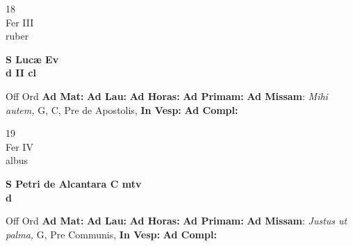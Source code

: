 \documentclass[10pt, openany]{book}
\begin{document}
    \begin{center}
        \begin{minipage}{3.5in}
            \vspace{2em}
            \begin{minipage}{0.5in}
                {\Huge 18} \\
                {\normalsize Fer III} \\
                {\normalsize ruber}
            \end{minipage}
            \begin{minipage}{3.0in}
                \textbf{ \large S Lucæ Ev \\
                \textnormal{\normalsize d II cl}} \\ 
            \end{minipage}
            \begin{justify}Off Ord
                \textbf{Ad Mat: }
                \textbf{Ad Lau: }
                \textbf{Ad Horas: }
                \textbf{Ad Primam: }\textbf{Ad Missam}: \textit{Mihi autem,} G, C, Pre de Apostolis,  
                \textbf{In Vesp: }
                \textbf{Ad Compl: }
            \end{justify}
        \end{minipage}
    \end{center}

    \begin{center}
        \begin{minipage}{3.5in}
            \vspace{2em}
            \begin{minipage}{0.5in}
                {\Huge 19} \\
                {\normalsize Fer IV} \\
                {\normalsize albus}
            \end{minipage}
            \begin{minipage}{3.0in}
                \textbf{ \large S Petri de Alcantara C mtv \\
                \textnormal{\normalsize d}} \\ 
            \end{minipage}
            \begin{justify}Off Ord
                \textbf{Ad Mat: }
                \textbf{Ad Lau: }
                \textbf{Ad Horas: }
                \textbf{Ad Primam: }\textbf{Ad Missam}: \textit{Justus ut palma,} G, Pre Communis,  
                \textbf{In Vesp: }
                \textbf{Ad Compl: }
            \end{justify}
        \end{minipage}
    \end{center}
\end{document}

